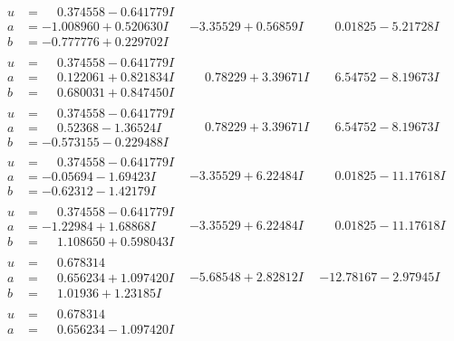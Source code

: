 \documentclass[1p]{elsarticle_modified}
\theoremstyle{definition}
\begin{document}
$$\begin{array}{c|c|c}
\begin{aligned}
u &= \phantom{-}0.374558 - 0.641779 I \\
a &= -1.008960 + 0.520630 I \\
b &= -0.777776 + 0.229702 I\end{aligned}
 & -3.35529 + 0.56859 I & \phantom{-}0.01825 - 5.21728 I \\ \hline\begin{aligned}
u &= \phantom{-}0.374558 - 0.641779 I \\
a &= \phantom{-}0.122061 + 0.821834 I \\
b &= \phantom{-}0.680031 + 0.847450 I\end{aligned}
 & \phantom{-}0.78229 + 3.39671 I & \phantom{-}6.54752 - 8.19673 I \\ \hline\begin{aligned}
u &= \phantom{-}0.374558 - 0.641779 I \\
a &= \phantom{-}0.52368 - 1.36524 I \\
b &= -0.573155 - 0.229488 I\end{aligned}
 & \phantom{-}0.78229 + 3.39671 I & \phantom{-}6.54752 - 8.19673 I \\ \hline\begin{aligned}
u &= \phantom{-}0.374558 - 0.641779 I \\
a &= -0.05694 - 1.69423 I \\
b &= -0.62312 - 1.42179 I\end{aligned}
 & -3.35529 + 6.22484 I & \phantom{-}0.01825 - 11.17618 I \\ \hline\begin{aligned}
u &= \phantom{-}0.374558 - 0.641779 I \\
a &= -1.22984 + 1.68868 I \\
b &= \phantom{-}1.108650 + 0.598043 I\end{aligned}
 & -3.35529 + 6.22484 I & \phantom{-}0.01825 - 11.17618 I \\ \hline\begin{aligned}
u &= \phantom{-}0.678314\phantom{ +0.000000I} \\
a &= \phantom{-}0.656234 + 1.097420 I \\
b &= \phantom{-}1.01936 + 1.23185 I\end{aligned}
 & -5.68548 + 2.82812 I & -12.78167 - 2.97945 I \\ \hline\begin{aligned}
u &= \phantom{-}0.678314\phantom{ +0.000000I} \\
a &= \phantom{-}0.656234 - 1.097420 I \\

\end{aligned}
\end{array}$$
\end{document}
